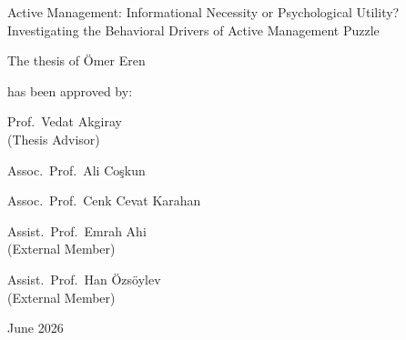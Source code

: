 \documentclass[12pt, a4paper]{article}
\begin{document}
\vspace*{0.55in}

\begin{center}
Active Management: Informational Necessity or Psychological Utility?\\
Investigating the Behavioral Drivers of Active Management Puzzle

\vspace{0.5in}

The thesis of Ömer Eren

has been approved by:

\vspace{0.5in}
\end{center}

\begin{singlespace}
\noindent Prof.\ Vedat Akgiray \hfill \underline{\hspace{3in}}\\
\noindent (Thesis Advisor)
\end{singlespace}

\vspace{0.5in}

\begin{singlespace}
\noindent Assoc.\ Prof.\ Ali Coşkun \hfill \underline{\hspace{3in}}
\end{singlespace}

\vspace{0.5in}

\begin{singlespace}
\noindent Assoc.\ Prof.\ Cenk Cevat Karahan \hfill \underline{\hspace{3in}}
\end{singlespace}

\vspace{0.5in}

\begin{singlespace}
\noindent Assist.\ Prof.\ Emrah Ahi \hfill \underline{\hspace{3in}}\\
\noindent (External Member)
\end{singlespace}

\vspace{0.5in}

\begin{singlespace}
\noindent Assist.\ Prof.\ Han Özsöylev \hfill \underline{\hspace{3in}}\\
\noindent (External Member)
\end{singlespace}

\vspace{0.5in}

\begin{center}
June 2026
\end{center}
\end{document}
